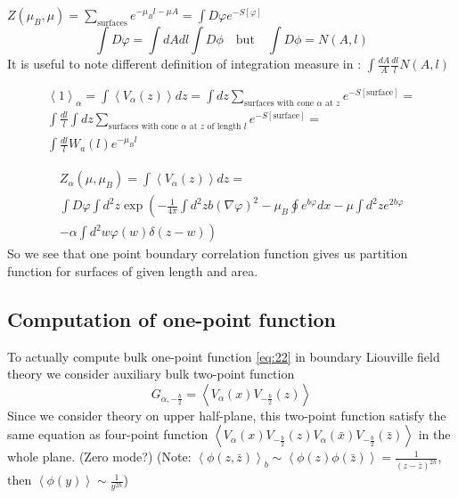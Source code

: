 \documentclass[12pt]{article}
\begin{document}
$Z(\mu_{B},\mu) = \sum_{\mbox{surfaces}} e^{-\mu_{B}l -\mu A}=\int D\varphi e^{-S[\varphi]}$
\begin{equation}
  \label{eq:28}
  \int D\varphi = \int dA dl \int D\phi \quad \mbox{but} \quad \int D\phi = N(A,l)
\end{equation}
It is useful to note different definition of integration measure in \cite{fateev2000boundary}: $\int
\frac{d A}{A}\frac{d l }{l} N(A,l)$

\begin{multline}
  \label{eq:30}
  \left< 1 \right>_{\alpha}=\int \left< V_{\alpha}(z)\right> dz = \int dz \sum_{\mbox{surfaces with cone
    }\alpha\mbox{ at }z} e^{-S[\mbox{surface}]}=\\
  \int \frac{dl}{l} \int dz  \sum_{\mbox{surfaces with cone
    }\alpha\mbox{ at }z \mbox{ of length }l}e^{-S[\mbox{surface}]}=\\
  \int\frac{dl}{l} W_{a}(l) e^{-\mu_{B}l}
\end{multline}


\begin{multline}
  \label{eq:31}
  Z_{\alpha}(\mu,\mu_{B}) = \int \left< V_{\alpha}(z)\right> dz=\\\int D\varphi\int d^{2}z \exp\left(-\frac{1}{4\pi} \int d^{2}z
    b(\nabla\varphi)^{2}-\mu_{B}\oint e^{b\varphi}dx -\mu\int d^{2}z e^{2b\varphi}\right.\\
  \left.-\alpha\int
  d^{2}w \varphi(w) \delta(z-w)\right)
\end{multline}
So we see that one point boundary correlation function gives us partition function for surfaces of
given length and area. 


\subsection{Computation of one-point function}
\label{sec:comp-one-point}

To actually compute bulk one-point function \eqref{eq:22} in boundary Liouville field theory  we
consider auxiliary bulk two-point function
\begin{equation}
  \label{eq:70}
  G_{\alpha,-\frac{b}{2}}=\left<V_{\alpha}(x)V_{-\frac{b}{2}}(z)\right>
\end{equation}
Since we consider theory on upper half-plane, this two-point function satisfy the same equation as
four-point function $\left<V_{\alpha}(x)V_{-\frac{b}{2}}(z)V_{\alpha}(\bar x)V_{-\frac{b}{2}}(\bar
  z)\right>$ in the whole plane. (Zero mode?) 
(Note: $\left<\phi(z,\bar z)\right>_{b}\sim\left<\phi(z)\phi(\bar z)\right>=\frac{1}{(z-\bar
  z)^{2h}}$, then $\left<\phi(y)\right>\sim \frac{1}{y^{2h}}$)
\end{document}
